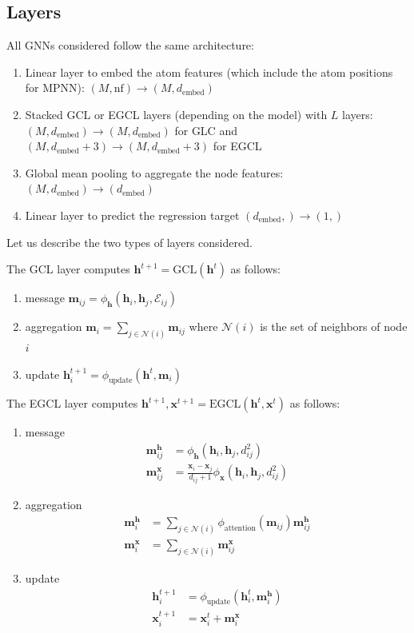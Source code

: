 \documentclass[sigconf]{acmart}
\begin{document}
\subsection{Layers}
All GNNs considered follow the same architecture:
\begin{enumerate}
    \item Linear layer to embed the atom features (which include the atom positions for MPNN): $(M,\text{nf}) \rightarrow (M, d_\text{embed})$
    \item Stacked GCL or EGCL layers (depending on the model) with $L$ layers: $(M, d_\text{embed}) \rightarrow (M, d_\text{embed})$ for GLC and $(M, d_\text{embed}+3) \rightarrow (M, d_\text{embed}+3)$ for EGCL
    \item Global mean pooling to aggregate the node features: $(M, d_\text{embed}) \rightarrow (d_\text{embed})$
    \item Linear layer to predict the regression target $(d_\text{embed},) \rightarrow (1,)$
\end{enumerate}

Let us describe the two types of layers considered.

The GCL layer computes $\mathbf{h}^{t+1} = \text{GCL}(\mathbf{h}^t)$ as follows:
\begin{enumerate}
    \item message $\mathbf{m}_{ij} = \phi_\mathbf{h}(\mathbf{h}_i, \mathbf{h}_j, \mathcal{E}_{ij})$
    \item aggregation $\mathbf{m}_i = \sum_{j\in\mathcal{N}(i)} \mathbf{m}_{ij}$ where $\mathcal{N}(i)$ is the set of neighbors of node $i$
    \item update $\mathbf{h}_i^{t+1} = \phi_\text{update}(\mathbf{h}^t, \mathbf{m}_i)$
\end{enumerate}

The EGCL layer computes $\mathbf{h}^{t+1}, \mathbf{x}^{t+1} = \text{EGCL}(\mathbf{h}^t, \mathbf{x}^t)$ as follows:
\begin{enumerate}
    \item message
    \begin{align*}
      \mathbf{m}_{ij}^\mathbf{h} &= \phi_\mathbf{h}(\mathbf{h}_i, \mathbf{h}_j, d_{ij}^2) \\
      \mathbf{m}_{ij}^\mathbf{x}& = \frac{\mathbf{x}_i - \mathbf{x}_j}{d_{ij}+1} \phi_\mathbf{x}(\mathbf{h}_i, \mathbf{h}_j, d_{ij}^2)
    \end{align*}
    \item aggregation
    \begin{align*}
      \mathbf{m}_i^\mathbf{h} &= \sum_{j\in\mathcal{N}(i)} \phi_\text{attention}(\mathbf{m}_{ij}) \mathbf{m}_{ij}^\mathbf{h} \\
      \mathbf{m}_i^\mathbf{x} &= \sum_{j\in\mathcal{N}(i)} \mathbf{m}_{ij}^\mathbf{x}
    \end{align*}
    \item update
    \begin{align*}
      \mathbf{h}_i^{t+1} &= \phi_\text{update}(\mathbf{h}_i^t, \mathbf{m}_i^\mathbf{h}) \\
      \mathbf{x}_i^{t+1} &= \mathbf{x}_i^t + \mathbf{m}_i^\mathbf{x}
    \end{align*}
\end{enumerate}
\end{document}
